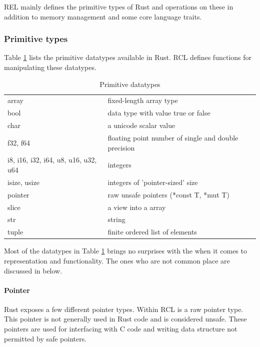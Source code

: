REL mainly defines the primitive types of Rust and operations on these in addition to memory management and some core language traits.

\subsubsection{Primitive types}

Table \ref{tab:rust:datatypes} lists the primitive datatypes available in Rust.
RCL defines functions for manipulating these datatypes.

\begin{table}[H]
  \begin{tabular}{l|l}
    array & fixed-length array type \\
    bool & data type with value true or false \\
    char & a unicode scalar value \\
    f32, f64 & floating point number of single and double precision \\
    i8, i16, i32, i64, u8, u16, u32, u64 & integers \\
    isize, usize & integers of 'pointer-sized' size \\
    pointer & raw unsafe pointers (*const T, *mut T) \\
    slice & a view into a array \\
    str & string \\
    tuple & finite ordered list of elements
  \end{tabular}

  \caption{Primitive datatypes}
  \label{tab:rust:datatypes}
\end{table}

Most of the datatypes in Table \ref{tab:rust:datatypes} brings no surprises with the when it comes to representation and functionality.
The ones who are not common place are discussed in below.

\paragraph{Pointer}

Rust exposes a few different pointer types.
Within RCL is a raw pointer type.
This pointer is not generally used in Rust code and is considered unsafe.
These pointers are used for interfacing with C code and writing data structure not permitted by safe pointers. 

